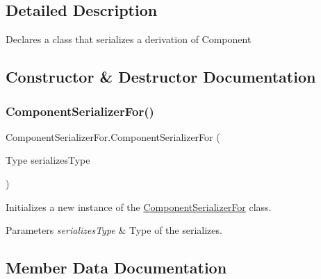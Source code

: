 \subsection{Detailed Description}
Declares a class that serializes a derivation of Component 



\subsection{Constructor \& Destructor Documentation}
\mbox{\label{class_component_serializer_for_a3a972befbb46f38eb0cff0efe4081476}} 
\subsubsection{\texorpdfstring{Component\+Serializer\+For()}{ComponentSerializerFor()}}
{\footnotesize\ttfamily Component\+Serializer\+For.\+Component\+Serializer\+For (\begin{DoxyParamCaption}\item[{Type}]{serializes\+Type }\end{DoxyParamCaption})\hspace{0.3cm}{\ttfamily [inline]}}



Initializes a new instance of the \hyperlink{class_component_serializer_for}{Component\+Serializer\+For} class. 


\begin{DoxyParams}{Parameters}
{\em serializes\+Type} & Type of the serializes.\\
\hline
\end{DoxyParams}


\subsection{Member Data Documentation}
\mbox{\label{class_component_serializer_for_a1f14524b26bf8afa0679193bda8124bf}} 
